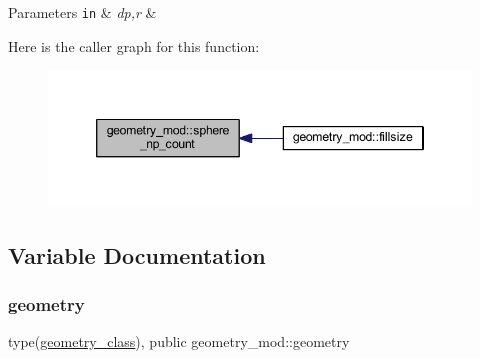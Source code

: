 \begin{DoxyParams}[1]{Parameters}
\mbox{\tt in}  & {\em dp,r} & \\
\hline
\end{DoxyParams}
Here is the caller graph for this function\+:\nopagebreak
\begin{figure}[H]
\begin{center}
\leavevmode
\includegraphics[width=346pt]{namespacegeometry__mod_a05de7940b4e7df5a2b31f3d0414e3743_icgraph}
\end{center}
\end{figure}


\subsection{Variable Documentation}
\mbox{\label{namespacegeometry__mod_ad2ad4f7e1138beaad5f37d5c15b7b457}} 
\subsubsection{\texorpdfstring{geometry}{geometry}}
{\footnotesize\ttfamily type(\hyperlink{structgeometry__mod_1_1geometry__class}{geometry\+\_\+class}), public geometry\+\_\+mod\+::geometry}

